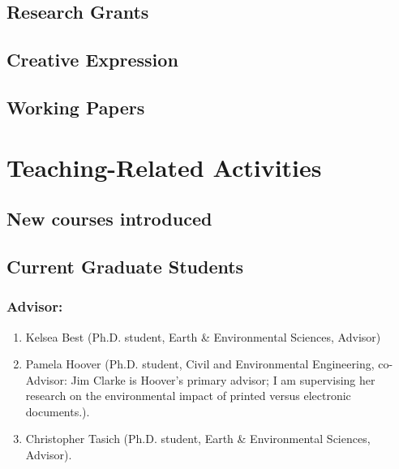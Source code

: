 \documentclass[10pt]{article}
\begin{document}
    \subsection{Research Grants}
    
\iftrue
    \subsection{Creative Expression}
    
\fi
%
\iftrue
    \subsection{Working Papers} %
    
\fi


\iftrue
\section{Teaching-Related Activities}
    \subsection{New courses introduced}
    
    \subsection{Current Graduate Students}
    \subsubsection{Advisor:}
    \begin{enumerate}
    \item Kelsea Best (Ph.D. student, Earth \& Environmental Sciences, Advisor)
    \item Pamela Hoover (Ph.D. student, Civil and Environmental Engineering, co-Advisor: Jim Clarke is Hoover's primary advisor; I am supervising her research on the environmental impact of printed versus electronic documents.).
    \item Christopher Tasich (Ph.D. student, Earth \& Environmental Sciences, Advisor).
    \end{enumerate}
\end{document}

